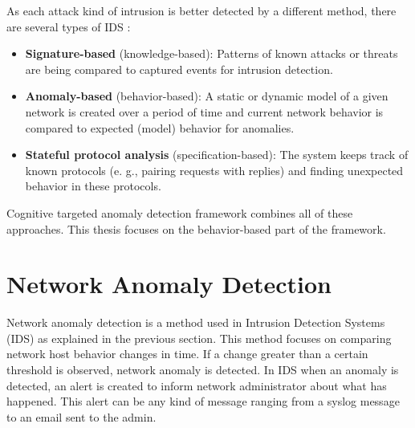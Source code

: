 \documentclass[thesis=B,english]{FITthesis}[2012/10/20]
\begin{document}
As each attack kind of intrusion is better detected by a different method, there are several types of IDS \cite{liao2013intrusion}:
\begin{itemize}                                                                   
    \item \textbf{Signature-based} (knowledge-based): Patterns of known attacks or threats are being compared to captured events for intrusion detection.
    \item \textbf{Anomaly-based} (behavior-based): A static or dynamic model of a given network is created over a period of time and current network behavior is compared to expected (model) behavior for anomalies.                                         
    \item \textbf{Stateful protocol analysis} (specification-based): The system keeps track of known protocols (e. g., pairing requests with replies) and finding unexpected behavior in these protocols.                       
\end{itemize}                                                                                                                              
Cognitive targeted anomaly detection framework combines all of these approaches.  
This thesis focuses on the behavior-based part of the framework.                
                                                                                  
\section{Network Anomaly Detection}                                               
Network anomaly detection is a method used in Intrusion Detection Systems (IDS) as explained in the previous section.
This method focuses on comparing network host behavior changes in time.           
If a change greater than a certain threshold is observed, network anomaly is detected.
In IDS when an anomaly is detected, an alert is created to inform network administrator about what has happened.
This alert can be any kind of message ranging from a syslog message to an email sent to the admin. \\
                                                                                  
\end{document}
